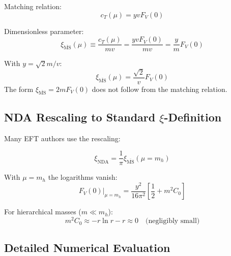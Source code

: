 	Matching relation:
	\begin{equation}
		c_T(\mu) = y v F_V(0)
	\end{equation}
	
	Dimensionless parameter:
	\begin{equation}
		\xi_{\overline{\text{MS}}}(\mu) \equiv \frac{c_T(\mu)}{mv} = \frac{yvF_V(0)}{mv} = \frac{y}{m}F_V(0)
	\end{equation}
	
	With $y = \sqrt{2} m/v$:
	\begin{equation}
		\xi_{\overline{\text{MS}}}(\mu) = \frac{\sqrt{2}}{v}F_V(0)
	\end{equation}
	The form $\xi_{\overline{\text{MS}}} = 2mF_V(0)$ does not follow from the matching relation.
	
	\subsection{NDA Rescaling to Standard $\xi$-Definition}
	
	Many EFT authors use the rescaling:
	
	\begin{equation}
		\xi_{\text{NDA}} = \frac{1}{\pi} \xi_{\overline{\text{MS}}}(\mu = m_h)
	\end{equation}
	
	With $\mu = m_h$ the logarithms vanish:
	\begin{equation}
		F_V(0)|_{\mu=m_h} = \frac{y^2}{16\pi^2}\left[\frac{1}{2} + m^2C_0\right]
	\end{equation}
	
	For hierarchical masses ($m \ll m_h$):
	\begin{equation}
		m^2C_0 \approx -r \ln r - r \approx 0 \quad \text{(negligibly small)}
	\end{equation}
	
	\subsection{Detailed Numerical Evaluation}
	
